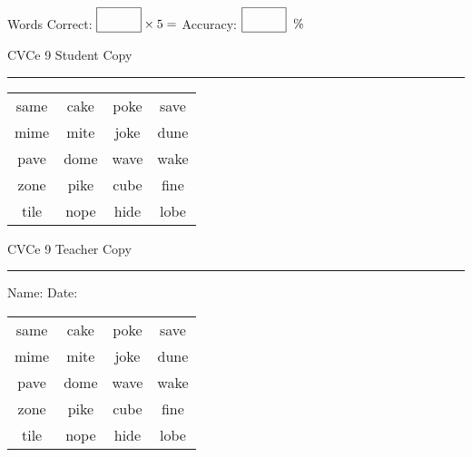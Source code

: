 \documentclass{memoir}
\begin{document}
\small

Words Correct: $\fbox{\phantom{\huge 100}} \times 5 = $ Accuracy: $\fbox{\phantom{\huge 100}}\;\; \%$ 

\vfill

\newpage


\footnotesize \noindent
CVCe 9 \hfill Student Copy
\smallskip
\hrule

\Large

\setlength{\tabcolsep}{14pt}
\def\arraystretch{2}

{\selectfont


\begin{vplace}[0.5]
\begin{center}
\begin{tabular}{cccc}
same & cake & poke & save \\
mime & mite & joke & dune \\
pave & dome & wave & wake \\
zone & pike & cube & fine \\
tile & nope & hide & lobe \\
\end{tabular}
\end{center}
\end{vplace}

}

\newpage

\footnotesize \noindent
CVCe 9 \hfill Teacher Copy
\smallskip
\hrule

\small

\vfill

\noindent
Name: \underline{\hspace{1.75in}} \hfill Date: \underline{\hspace{1in}}

\Large

{\selectfont


\begin{vplace}[0.5]
\begin{center}
\begin{tabular}{cccc}
same & cake & poke & save \\
mime & mite & joke & dune \\
pave & dome & wave & wake \\
zone & pike & cube & fine \\
tile & nope & hide & lobe \\
\end{tabular}
\end{center}
\end{vplace}



}
\end{document}
